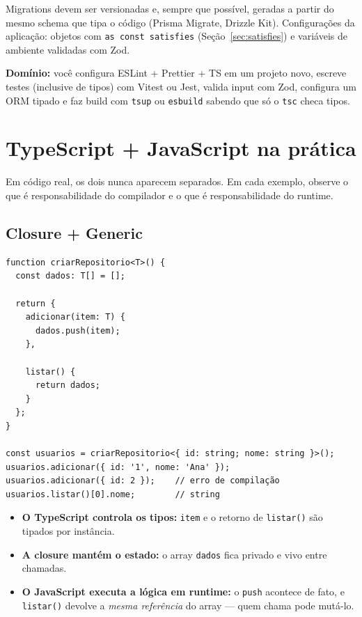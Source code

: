 \documentclass[12pt,a4paper,oneside]{book}
\newcommand{\code}[1]{\texttt{#1}}
\newcommand{\dom}[1]{\begin{dominio}\textbf{Domínio:} #1\end{dominio}}
\begin{document}
Migrations devem ser versionadas e, sempre que possível, geradas a partir do mesmo schema que tipa o código (Prisma Migrate, Drizzle Kit). Configurações da aplicação: objetos com \code{as const satisfies} (Seção~\ref{sec:satisfies}) e variáveis de ambiente validadas com Zod.

\dom{você configura ESLint + Prettier + TS em um projeto novo, escreve testes (inclusive de tipos) com Vitest ou Jest, valida input com Zod, configura um ORM tipado e faz build com \code{tsup} ou \code{esbuild} sabendo que só o \code{tsc} checa tipos.}

\chapter{TypeScript + JavaScript na prática}
\label{cap:pratica}

Em código real, os dois nunca aparecem separados. Em cada exemplo, observe o que é responsabilidade do compilador e o que é responsabilidade do runtime.

\section{Closure + Generic}

\begin{verbatim}
function criarRepositorio<T>() {
  const dados: T[] = [];

  return {
    adicionar(item: T) {
      dados.push(item);
    },

    listar() {
      return dados;
    }
  };
}

const usuarios = criarRepositorio<{ id: string; nome: string }>();
usuarios.adicionar({ id: '1', nome: 'Ana' });
usuarios.adicionar({ id: 2 });    // erro de compilação
usuarios.listar()[0].nome;        // string
\end{verbatim}

\begin{itemize}
  \item \textbf{O TypeScript controla os tipos:} \code{item} e o retorno de \code{listar()} são tipados por instância.
  \item \textbf{A closure mantém o estado:} o array \code{dados} fica privado e vivo entre chamadas.
  \item \textbf{O JavaScript executa a lógica em runtime:} o \code{push} acontece de fato, e \code{listar()} devolve a \emph{mesma referência} do array --- quem chama pode mutá-lo.
\end{itemize}
\end{document}
